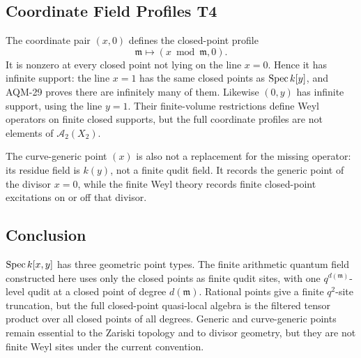 \subsection{Coordinate Field Profiles T4}

The coordinate pair \((x,0)\) defines the closed-point profile
\[
  \mathfrak m\longmapsto (x\bmod\mathfrak m,0).
\]
It is nonzero at every closed point not lying on the line \(x=0\).  Hence it
has infinite support: the line \(x=1\) has the same closed points as
\(\operatorname{Spec} k[y]\), and AQM-29 proves there are infinitely many of them.  Likewise
\((0,y)\) has infinite support, using the line \(y=1\).  Their
finite-volume restrictions define Weyl operators on finite closed supports,
but the full coordinate profiles are not elements of
\(\mathcal A_2(X_2)\).

The curve-generic point \((x)\) is also not a replacement for the missing
operator: its residue field is \(k(y)\), not a finite qudit field.  It records
the generic point of the divisor \(x=0\), while the finite Weyl theory records
finite closed-point excitations on or off that divisor.

\subsection{Conclusion}

\(\operatorname{Spec} k[x,y]\) has three geometric point types.  The finite arithmetic
quantum field constructed here uses only the closed points as finite qudit
sites, with one \(q^{d(\mathfrak m)}\)-level qudit at a closed point of degree
\(d(\mathfrak m)\).  Rational points give a finite \(q^2\)-site truncation,
but the full closed-point quasi-local algebra is the filtered tensor product
over all closed points of all degrees.  Generic and curve-generic points
remain essential to the Zariski topology and to divisor geometry, but they
are not finite Weyl sites under the current convention.
